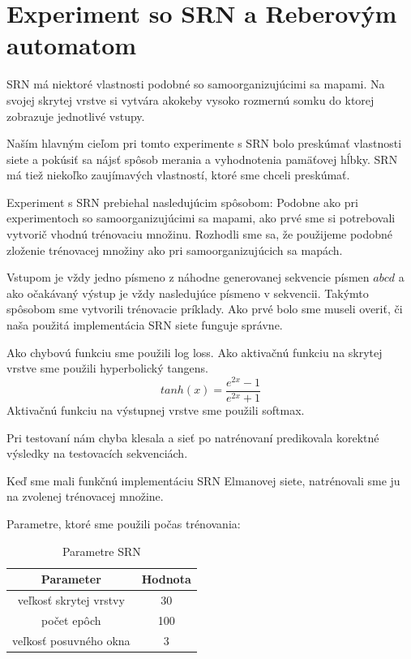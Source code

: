 \section{Experiment so SRN a Reberovým automatom}
SRN má niektoré vlastnosti podobné so samoorganizujúcimi sa mapami. 
Na svojej skrytej vrstve si vytvára akokeby vysoko rozmernú somku do ktorej zobrazuje jednotlivé vstupy. 

Naším hlavným cieľom pri tomto experimente s SRN bolo preskúmať vlastnosti siete a pokúsiť sa nájsť 
spôsob merania a vyhodnotenia pamäťovej hĺbky.
SRN má tiež niekoľko zaujímavých vlastností, ktoré sme chceli preskúmať.

Experiment s SRN prebiehal nasledujúcim spôsobom:
Podobne ako pri experimentoch so samoorganizujúcimi sa mapami, ako prvé sme si potrebovali vytvorič vhodnú trénovaciu množinu.
Rozhodli sme sa, že použijeme podobné zloženie trénovacej množiny ako pri samoorganizujúcich sa mapách.

Vstupom je vždy jedno písmeno z náhodne generovanej sekvencie písmen $abcd$ a ako očakávaný výstup je vždy nasledujúce písmeno v sekvencii.
Takýmto spôsobom sme vytvorili trénovacie príklady.
Ako prvé bolo sme museli overiť, či naša použitá implementácia SRN siete funguje správne.

Ako chybovú funkciu sme použili log loss.
Ako aktivačnú funkciu na skrytej vrstve sme použili hyperbolický tangens.
\begin{equation}
    tanh(x) = \frac{e^{2x} - 1}{e^{2x} + 1}
\end{equation}
Aktivačnú funkciu na výstupnej vrstve sme použili softmax. 


Pri testovaní nám chyba klesala a sieť po natrénovaní predikovala korektné výsledky na testovacích sekvenciách.

Keď sme mali funkčnú implementáciu SRN Elmanovej siete, natrénovali sme ju na zvolenej trénovacej množine.

Parametre, ktoré sme použili počas trénovania:

\begin{table}[h!]
    \centering
    \begin{tabular}{|c|c|} 
     \hline
     Parameter & Hodnota \\ 
     \hline
     veľkosť skrytej vrstvy & 30  \\
     \hline
     počet epôch & 100  \\
     \hline
     veľkosť posuvného okna & 3  \\
     \hline
    \end{tabular}
    \caption{Parametre SRN}
    \label{table:1}
\end{table}



